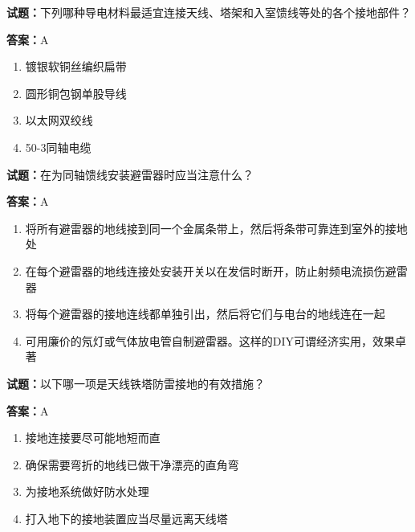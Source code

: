 \documentclass{ctexbook}
\begin{document}
\textbf{试题：}下列哪种导电材料最适宜连接天线、塔架和入室馈线等处的各个接地部件？ 

\textbf{答案：}A 

\begin{enumerate}[leftmargin=3em]
  \item 镀银软铜丝编织扁带 

  \item 圆形铜包钢单股导线 

  \item 以太网双绞线 

  \item 50-3同轴电缆 

\end{enumerate}





\vspace{1em}

\textbf{试题：}在为同轴馈线安装避雷器时应当注意什么？ 

\textbf{答案：}A 

\begin{enumerate}[leftmargin=3em]
  \item 将所有避雷器的地线接到同一个金属条带上，然后将条带可靠连到室外的接地处 

  \item 在每个避雷器的地线连接处安装开关以在发信时断开，防止射频电流损伤避雷器 

  \item 将每个避雷器的接地连线都单独引出，然后将它们与电台的地线连在一起 

  \item 可用廉价的氖灯或气体放电管自制避雷器。这样的DIY可谓经济实用，效果卓著 

\end{enumerate}





\vspace{1em}

\textbf{试题：}以下哪一项是天线铁塔防雷接地的有效措施？ 

\textbf{答案：}A 

\begin{enumerate}[leftmargin=3em]
  \item 接地连接要尽可能地短而直 

  \item 确保需要弯折的地线已做干净漂亮的直角弯 

  \item 为接地系统做好防水处理 


  \item 打入地下的接地装置应当尽量远离天线塔 

\end{enumerate}
\end{document}
